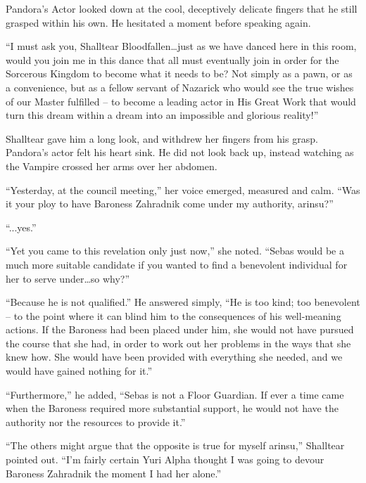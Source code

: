  

Pandora’s Actor looked down at the cool, deceptively delicate fingers that he still grasped within his own. He hesitated a moment before speaking again.

 

“I must ask you, Shalltear Bloodfallen…just as we have danced here in this room, would you join me in this dance that all must eventually join in order for the Sorcerous Kingdom to become what it needs to be? Not simply as a pawn, or as a convenience, but as a fellow servant of Nazarick who would see the true wishes of our Master fulfilled – to become a leading actor in His Great Work that would turn this dream within a dream into an impossible and glorious reality!”

 

Shalltear gave him a long look, and withdrew her fingers from his grasp. Pandora’s actor felt his heart sink. He did not look back up, instead watching as the Vampire crossed her arms over her abdomen.

 

“Yesterday, at the council meeting,” her voice emerged, measured and calm. “Was it your ploy to have Baroness Zahradnik come under my authority, arinsu?”

 

“...yes.”

 

“Yet you came to this revelation only just now,” she noted. “Sebas would be a much more suitable candidate if you wanted to find a benevolent individual for her to serve under…so why?”

 

“Because he is not qualified.” He answered simply, “He is too kind; too benevolent – to the point where it can blind him to the consequences of his well-meaning actions. If the Baroness had been placed under him, she would not have pursued the course that she had, in order to work out her problems in the ways that she knew how. She would have been provided with everything she needed, and we would have gained nothing for it.”

 

“Furthermore,” he added, “Sebas is not a Floor Guardian. If ever a time came when the Baroness required more substantial support, he would not have the authority nor the resources to provide it.”

 

“The others might argue that the opposite is true for myself arinsu,” Shalltear pointed out. “I’m fairly certain Yuri Alpha thought I was going to devour Baroness Zahradnik the moment I had her alone.”

